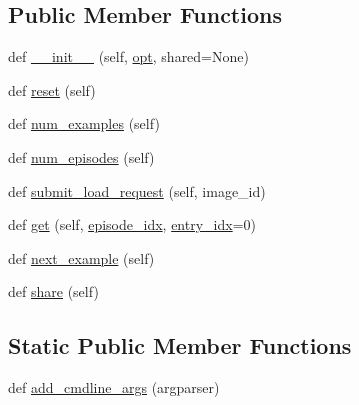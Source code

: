 \subsection*{Public Member Functions}
\begin{DoxyCompactItemize}
\item 
def \hyperlink{classparlai_1_1tasks_1_1flickr30k_1_1agents_1_1DefaultTeacher_a656b935d2ed6a7c7c17ec8701c506cc8}{\+\_\+\+\_\+init\+\_\+\+\_\+} (self, \hyperlink{classparlai_1_1core_1_1agents_1_1Teacher_a3ce6243860ce978a897922863ed32fa4}{opt}, shared=None)
\item 
def \hyperlink{classparlai_1_1tasks_1_1flickr30k_1_1agents_1_1DefaultTeacher_a19271160caed973aa96611d3898a6209}{reset} (self)
\item 
def \hyperlink{classparlai_1_1tasks_1_1flickr30k_1_1agents_1_1DefaultTeacher_a58f86f4eb5a109d5c2a9034d701d452c}{num\+\_\+examples} (self)
\item 
def \hyperlink{classparlai_1_1tasks_1_1flickr30k_1_1agents_1_1DefaultTeacher_a0711151a8588c499abdda943b27793a8}{num\+\_\+episodes} (self)
\item 
def \hyperlink{classparlai_1_1tasks_1_1flickr30k_1_1agents_1_1DefaultTeacher_aac22712a270cb75686f9595913ab6970}{submit\+\_\+load\+\_\+request} (self, image\+\_\+id)
\item 
def \hyperlink{classparlai_1_1tasks_1_1flickr30k_1_1agents_1_1DefaultTeacher_a55dc5ed3f7e99ad143248a9fba87e2b2}{get} (self, \hyperlink{classparlai_1_1core_1_1teachers_1_1FixedDialogTeacher_afd4ebab8063eb42d182d30a1a41f133e}{episode\+\_\+idx}, \hyperlink{classparlai_1_1core_1_1teachers_1_1FixedDialogTeacher_ae3201b15f3c3b46a2f3511bad9b43e7d}{entry\+\_\+idx}=0)
\item 
def \hyperlink{classparlai_1_1tasks_1_1flickr30k_1_1agents_1_1DefaultTeacher_ada88912036e5d75c2f2a5bff298b1d88}{next\+\_\+example} (self)
\item 
def \hyperlink{classparlai_1_1tasks_1_1flickr30k_1_1agents_1_1DefaultTeacher_ae64406b518a24c25b8d4db2c614cafea}{share} (self)
\end{DoxyCompactItemize}
\subsection*{Static Public Member Functions}
\begin{DoxyCompactItemize}
\item 
def \hyperlink{classparlai_1_1tasks_1_1flickr30k_1_1agents_1_1DefaultTeacher_a6a4661fe44f7b4c0d0e8329218bc15f6}{add\+\_\+cmdline\+\_\+args} (argparser)
\end{DoxyCompactItemize}
